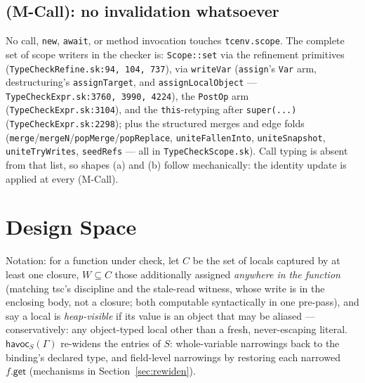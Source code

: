 \documentclass[11pt]{article}
\newcommand{\Env}{\Gamma}
\newcommand{\havoc}{\mathsf{havoc}}
\begin{document}
\subsection{(M-Call): no invalidation whatsoever}
No call, \texttt{new}, \texttt{await}, or method invocation touches
\texttt{tcenv.scope}. The complete set of scope writers in the checker
is: \texttt{Scope::set} via the refinement primitives
(\texttt{TypeCheckRefine.sk:94, 104, 737}), via \texttt{writeVar}
(\texttt{assign}'s \texttt{Var} arm, destructuring's
\texttt{assignTarget}, and \texttt{assignLocalObject} —
\texttt{TypeCheckExpr.sk:3760, 3990, 4224}), the \texttt{PostOp} arm
(\texttt{TypeCheckExpr.sk:3104}), and the \texttt{this}-retyping after
\texttt{super(...)} (\texttt{TypeCheckExpr.sk:2298}); plus the
structured merges and edge folds
(\texttt{merge}/\texttt{mergeN}/\texttt{popMerge}/\texttt{popReplace},
\texttt{uniteFallenInto}, \texttt{uniteSnapshot},
\texttt{uniteTryWrites}, \texttt{seedRefs} — all in
\texttt{TypeCheckScope.sk}). Call typing is absent from that list, so
shapes (a) and (b) follow mechanically: the identity update is applied
at every (M-Call).

\section{Design Space}
\label{sec:design}

Notation: for a function under check, let $C$ be the set of locals
captured by at least one closure, $W \subseteq C$ those additionally
assigned \emph{anywhere in the function} (matching tsc's discipline and
the stale-read witness, whose write is in the enclosing body, not a
closure; both computable syntactically in one pre-pass), and say a local
is
\emph{heap-visible} if its value is an object that may be aliased —
conservatively: any object-typed local other than a fresh, never-escaping
literal. $\havoc_S(\Env)$ re-widens the entries of $S$: whole-variable
narrowings back to the binding's declared type, and field-level
narrowings by restoring each narrowed $f.\mathsf{get}$ (mechanisms in
Section~\ref{sec:rewiden}).
\end{document}
